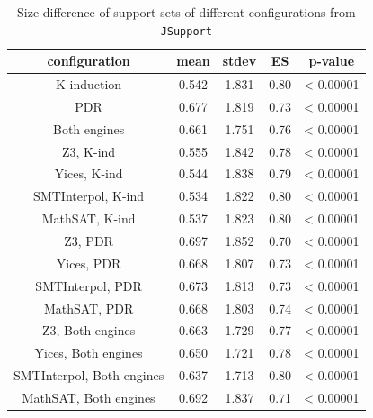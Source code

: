 \begin{table}
  \centering
  \begin{tabular}{|c|c|c|c|c|}
     \hline
     configuration & mean & stdev & ES & p-value \\[0.5ex]
     \hline\hline
     K-induction  & 0.542 & 1.831 & 0.80 & < 0.00001\\[0.5ex] %
     PDR & 0.677 & 1.819 & 0.73 & < 0.00001\\[0.5ex] %
     Both engines & 0.661 & 1.751 & 0.76 & < 0.00001\\[0.5ex]
     \hline
     Z3, K-ind & 0.555 & 1.842 & 0.78 & < 0.00001\\[0.5ex]%
     Yices, K-ind  & 0.544 & 1.838 & 0.79 & < 0.00001\\[0.5ex]
     SMTInterpol, K-ind & 0.534 & 1.822 & 0.80 & < 0.00001\\[0.5ex]
     MathSAT, K-ind  & 0.537 & 1.823 & 0.80 & < 0.00001\\[0.5ex]
     \hline
     Z3, PDR & 0.697 & 1.852 & 0.70 & < 0.00001\\[0.5ex]%
     Yices, PDR  & 0.668 & 1.807 & 0.73 & < 0.00001\\[0.5ex]
     SMTInterpol, PDR  & 0.673 & 1.813 & 0.73 & < 0.00001\\[0.5ex]
     MathSAT, PDR  & 0.668 & 1.803 & 0.74 & < 0.00001\\[0.5ex]
     \hline
     Z3, Both engines & 0.663 & 1.729 & 0.77 & < 0.00001\\[0.5ex]
     Yices, Both engines  & 0.650 & 1.721 & 0.78 & < 0.00001\\[0.5ex]
     SMTInterpol, Both engines  & 0.637 & 1.713 & 0.80 & < 0.00001\\[0.5ex]
     MathSAT, Both engines & 0.692 & 1.837 & 0.71 & < 0.00001\\[0.5ex]
     \hline
   \end{tabular}
     \caption{Size difference of support sets of different configurations from \texttt{JSupport}}\label{tab:minimality}
\end{table}


